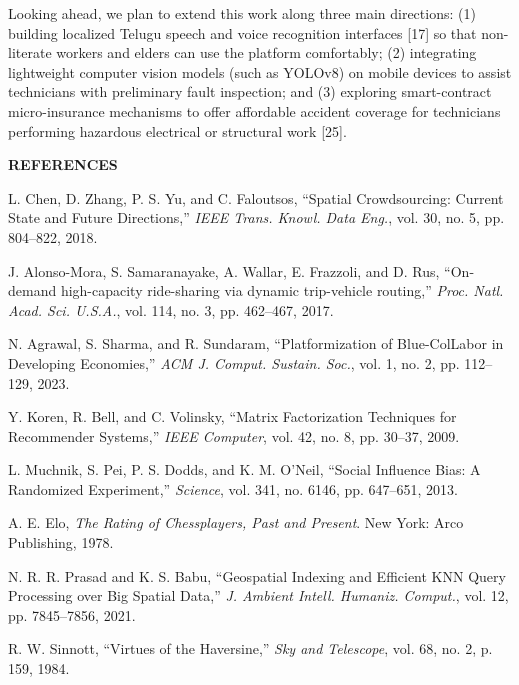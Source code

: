 \documentclass[10pt,twocolumn,a4paper]{article}
\begin{document}
Looking ahead, we plan to extend this work along three main directions: (1) building localized Telugu speech and voice recognition interfaces [17] so that non-literate workers and elders can use the platform comfortably; (2) integrating lightweight computer vision models (such as YOLOv8) on mobile devices to assist technicians with preliminary fault inspection; and (3) exploring smart-contract micro-insurance mechanisms to offer affordable accident coverage for technicians performing hazardous electrical or structural work [25].

\vspace{1.2em}
\noindent
\begin{center}
\textbf{\large REFERENCES}
\end{center}

\vspace{0.5em}
\small
\noindent
[1] L. Chen, D. Zhang, P. S. Yu, and C. Faloutsos, ``Spatial Crowdsourcing: Current State and Future Directions,'' \textit{IEEE Trans. Knowl. Data Eng.}, vol. 30, no. 5, pp. 804--822, 2018.

\noindent
[2] J. Alonso-Mora, S. Samaranayake, A. Wallar, E. Frazzoli, and D. Rus, ``On-demand high-capacity ride-sharing via dynamic trip-vehicle routing,'' \textit{Proc. Natl. Acad. Sci. U.S.A.}, vol. 114, no. 3, pp. 462--467, 2017.

\noindent
[3] N. Agrawal, S. Sharma, and R. Sundaram, ``Platformization of Blue-ColLabor in Developing Economies,'' \textit{ACM J. Comput. Sustain. Soc.}, vol. 1, no. 2, pp. 112--129, 2023.

\noindent
[4] Y. Koren, R. Bell, and C. Volinsky, ``Matrix Factorization Techniques for Recommender Systems,'' \textit{IEEE Computer}, vol. 42, no. 8, pp. 30--37, 2009.

\noindent
[5] L. Muchnik, S. Pei, P. S. Dodds, and K. M. O'Neil, ``Social Influence Bias: A Randomized Experiment,'' \textit{Science}, vol. 341, no. 6146, pp. 647--651, 2013.

\noindent
[6] A. E. Elo, \textit{The Rating of Chessplayers, Past and Present}. New York: Arco Publishing, 1978.

\noindent
[7] N. R. R. Prasad and K. S. Babu, ``Geospatial Indexing and Efficient KNN Query Processing over Big Spatial Data,'' \textit{J. Ambient Intell. Humaniz. Comput.}, vol. 12, pp. 7845--7856, 2021.

\noindent
[8] R. W. Sinnott, ``Virtues of the Haversine,'' \textit{Sky and Telescope}, vol. 68, no. 2, p. 159, 1984.
\end{document}

